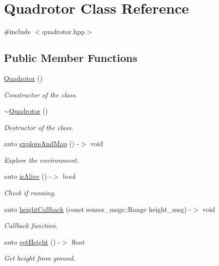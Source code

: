 \hypertarget{class_quadrotor}{}\section{Quadrotor Class Reference}
\label{class_quadrotor}


{\ttfamily \#include $<$quadrotor.\+hpp$>$}

\subsection*{Public Member Functions}
\begin{DoxyCompactItemize}
\item 
\hyperlink{class_quadrotor_a07d8eee0967402173f8e5f7c9f68b87c}{Quadrotor} ()
\begin{DoxyCompactList}\small\item\em Constructor of the class. \end{DoxyCompactList}\item 
\hyperlink{class_quadrotor_aba3d192815f20e50aa79a5626b21fd9f}{$\sim$\+Quadrotor} ()
\begin{DoxyCompactList}\small\item\em Destructor of the class. \end{DoxyCompactList}\item 
auto \hyperlink{class_quadrotor_ada6914b0c52f80bc8eee1382eac87212}{explore\+And\+Map} () -\/$>$ void
\begin{DoxyCompactList}\small\item\em Explore the environment. \end{DoxyCompactList}\item 
auto \hyperlink{class_quadrotor_a2b0649be2fcbd1adae9de65e7290220b}{is\+Alive} () -\/$>$ bool
\begin{DoxyCompactList}\small\item\em Check if running. \end{DoxyCompactList}\item 
auto \hyperlink{class_quadrotor_aa9d554a75dc370d45f7b393a92fd8776}{height\+Callback} (const sensor\+\_\+msgs\+::\+Range height\+\_\+msg) -\/$>$ void
\begin{DoxyCompactList}\small\item\em Callback function. \end{DoxyCompactList}\item 
auto \hyperlink{class_quadrotor_a91af017513dfd6ef295844bb14718570}{get\+Height} () -\/$>$ float
\begin{DoxyCompactList}\small\item\em Get height from ground. \end{DoxyCompactList}\item 

\end{DoxyCompactItemize}
